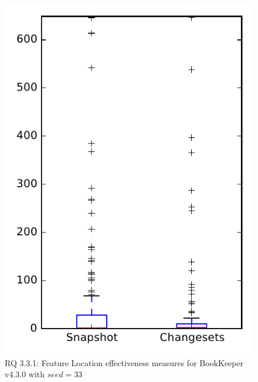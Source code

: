 
\begin{figure}
\centering
\includegraphics[height=0.4\textheight]{figures/flt_seed/rq1_bookkeeper_33}
\caption{RQ 3.3.1: Feature Location effectiveness measures for BookKeeper v4.3.0 with $seed=33$}
\label{fig:flt_seed:rq1:bookkeeper}
\end{figure}
